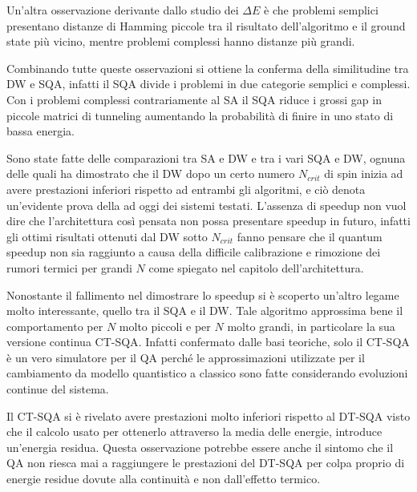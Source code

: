 Un'altra osservazione derivante dallo studio dei $\Delta E$ è che problemi semplici presentano distanze di Hamming piccole tra il risultato dell'algoritmo e il ground state più vicino, mentre problemi complessi hanno distanze più grandi.

Combinando tutte queste osservazioni si ottiene la conferma della similitudine tra DW e SQA, infatti il SQA divide i problemi in due categorie semplici e complessi. Con i problemi complessi contrariamente al SA il SQA riduce i grossi gap in piccole matrici di tunneling aumentando la probabilità di finire in uno stato di bassa energia.

\cite{DDQS}Sono state fatte delle comparazioni tra SA e DW\cite{DDQS} e tra i vari SQA e DW\cite{QVC}, ognuna delle quali ha dimostrato che il DW dopo un certo numero $N_{crit}$ di spin inizia ad avere prestazioni inferiori rispetto ad entrambi gli algoritmi, e ciò denota un'evidente prova della  ad oggi dei sistemi testati. L'assenza di speedup non vuol dire che l'architettura così pensata non possa presentare speedup in futuro, infatti gli ottimi risultati ottenuti dal DW sotto $N_{crit}$ fanno pensare che il quantum speedup non sia raggiunto a causa della difficile calibrazione e rimozione dei rumori termici per grandi $N$ come spiegato nel capitolo dell'architettura.

Nonostante il fallimento nel dimostrare lo speedup si è scoperto un'altro legame molto interessante, quello tra il SQA e il DW. Tale algoritmo approssima bene il comportamento per $N$ molto piccoli e per $N$ molto grandi\cite{EQA}, in particolare la sua versione continua CT-SQA\cite{QVC}. Infatti confermato dalle basi teoriche, solo il CT-SQA è un vero simulatore per il QA perché le approssimazioni utilizzate per il cambiamento da modello quantistico a classico sono fatte considerando evoluzioni continue del sistema.

Il CT-SQA si è rivelato avere prestazioni molto inferiori rispetto al DT-SQA visto che il calcolo usato per ottenerlo attraverso la media delle energie, introduce un'energia residua. Questa osservazione potrebbe essere anche il sintomo che il QA non riesca mai a raggiungere le prestazioni del DT-SQA per colpa proprio di energie residue dovute alla continuità e non dall'effetto termico.

